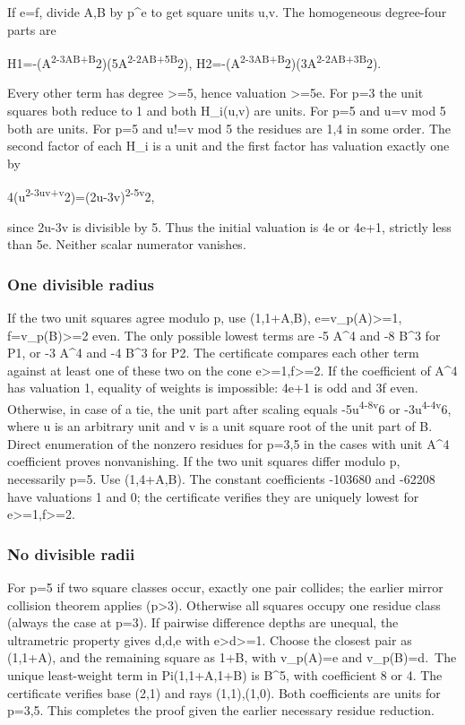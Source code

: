 \documentclass[
  10pt,
]{article}
\begin{document}
If e=f, divide A,B by p\^{}e to get square units u,v. The homogeneous
degree-four parts are

H1=-(A\textsuperscript{2-3AB+B}2)(5A\textsuperscript{2-2AB+5B}2),
H2=-(A\textsuperscript{2-3AB+B}2)(3A\textsuperscript{2-2AB+3B}2).

Every other term has degree \textgreater=5, hence valuation
\textgreater=5e. For p=3 the unit squares both reduce to 1 and both
H\_i(u,v) are units. For p=5 and u=v mod 5 both are units. For p=5 and
u!=v mod 5 the residues are 1,4 in some order. The second factor of each
H\_i is a unit and the first factor has valuation exactly one by

4(u\textsuperscript{2-3uv+v}2)=(2u-3v)\textsuperscript{2-5v}2,

since 2u-3v is divisible by 5. Thus the initial valuation is 4e or 4e+1,
strictly less than 5e. Neither scalar numerator vanishes.

\subsubsection{One divisible radius}\label{one-divisible-radius}

If the two unit squares agree modulo p, use (1,1+A,B),
e=v\_p(A)\textgreater=1, f=v\_p(B)\textgreater=2 even. The only possible
lowest terms are -5 A\^{}4 and -8 B\^{}3 for P1, or -3 A\^{}4 and -4
B\^{}3 for P2. The certificate compares each other term against at least
one of these two on the cone e\textgreater=1,f\textgreater=2. If the
coefficient of A\^{}4 has valuation 1, equality of weights is
impossible: 4e+1 is odd and 3f even. Otherwise, in case of a tie, the
unit part after scaling equals -5u\textsuperscript{4-8v}6 or
-3u\textsuperscript{4-4v}6, where u is an arbitrary unit and v is a unit
square root of the unit part of B. Direct enumeration of the nonzero
residues for p=3,5 in the cases with unit A\^{}4 coefficient proves
nonvanishing. If the two unit squares differ modulo p, necessarily p=5.
Use (1,4+A,B). The constant coefficients -103680 and -62208 have
valuations 1 and 0; the certificate verifies they are uniquely lowest
for e\textgreater=1,f\textgreater=2.

\subsubsection{No divisible radii}\label{no-divisible-radii}

For p=5 if two square classes occur, exactly one pair collides; the
earlier mirror collision theorem applies (p\textgreater3). Otherwise all
squares occupy one residue class (always the case at p=3). If pairwise
difference depths are unequal, the ultrametric property gives d,d,e with
e\textgreater d\textgreater=1. Choose the closest pair as (1,1+A), and
the remaining square as 1+B, with v\_p(A)=e and v\_p(B)=d.~The unique
least-weight term in Pi(1,1+A,1+B) is B\^{}5, with coefficient 8 or 4.
The certificate verifies base (2,1) and rays (1,1),(1,0). Both
coefficients are units for p=3,5. This completes the proof given the
earlier necessary residue reduction.
\end{document}
